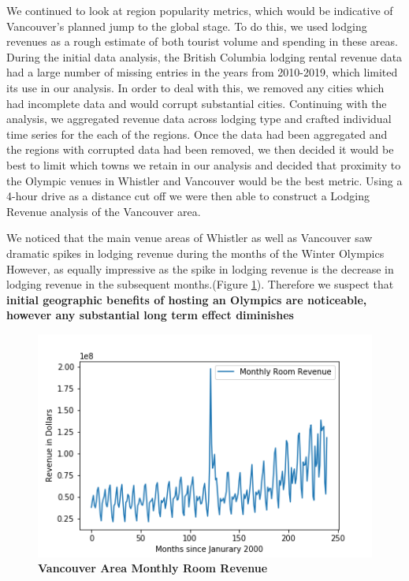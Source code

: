 \documentclass[11pt, twocolumn]{article}
\begin{document}
    We continued to look at region popularity metrics, which would be indicative of Vancouver's planned jump to the global stage. To do this, we used lodging revenues as a rough estimate of both tourist volume and spending in these areas. During the initial data analysis, the British Columbia lodging rental revenue data had a large number of missing entries in the years from 2010-2019, which limited its use in our analysis. In order to deal with this, we removed any cities which had incomplete data and would corrupt substantial cities. Continuing with the analysis, we aggregated revenue data across lodging type and crafted individual time series for the each of the regions. Once the data had been aggregated and the regions with corrupted data had been removed, we then decided it would be best to limit which towns we retain in our analysis and decided that proximity to the Olympic venues in Whistler and Vancouver would be the best metric. Using a 4-hour drive as a distance cut off we were then able to construct a Lodging Revenue analysis of the Vancouver area.
    
    We noticed that the main venue areas of Whistler as well as Vancouver saw dramatic spikes in lodging revenue during the months of the Winter Olympics However, as equally impressive as the spike in lodging revenue is the decrease in lodging revenue in the subsequent months.(Figure \ref{fig:Vancouver_Room_rev}). Therefore we suspect that \textbf{initial geographic benefits of hosting an Olympics are noticeable, however any substantial long term effect diminishes}
    
    \begin{figure}[H]
        \centering
            \includegraphics[scale=0.55]{Vancouver_Area_Room_Revenue.png}
        \caption{\textbf{Vancouver Area Monthly Room Revenue}}
        \label{fig:Vancouver_Room_rev}
    \end{figure}
    
\end{document}
